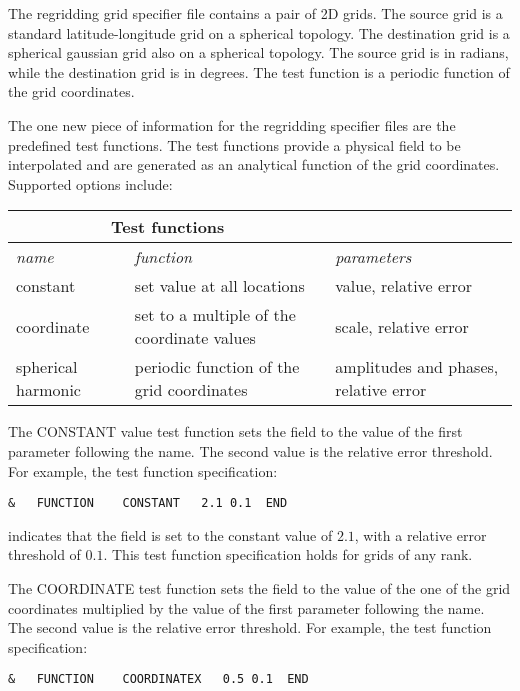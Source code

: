 The regridding grid specifier file contains a pair of 2D grids. The source grid is a standard latitude-longitude grid on a spherical topology. The destination grid is a spherical gaussian grid also on a spherical topology. The source grid is in radians, while the destination grid is in degrees. The test function is a periodic function of the grid coordinates. 

The one new piece of information for the regridding specifier files are the predefined test functions. The test functions provide a physical field to be interpolated and are generated as an analytical function of the grid coordinates. Supported options include:
\begin{center}
\begin{tabular}{| l | l | l |} 
\multicolumn{2}{c}{ Test functions }  \\
\hline 
{\em name } & {\em function} & {\em parameters} \\
\hline \hline
constant & set value at all locations & value, relative error \\
coordinate & set to a multiple of the coordinate values & scale, relative error \\
spherical harmonic & periodic function of the grid coordinates & amplitudes and phases, relative error \\
\hline 
\end{tabular}
\end{center}

The CONSTANT value test function sets the field to the value of the first parameter following the name. The second value is the relative error threshold. For example, the test function specification:

\begin{center}
\begin{verbatim}
&   FUNCTION    CONSTANT   2.1 0.1  END
\end{verbatim}
\end{center}

indicates that the field is set to the constant value of $2.1$, with a relative error threshold 
of $0.1$. This test function specification holds for grids of any rank. 

The COORDINATE test function sets the field to the value of the one of the grid coordinates multiplied by the value of the first parameter following the name. The second value is the relative error threshold. For example, the test function specification:

\begin{center}
\begin{verbatim}
&   FUNCTION    COORDINATEX   0.5 0.1  END
\end{verbatim}
\end{center}

